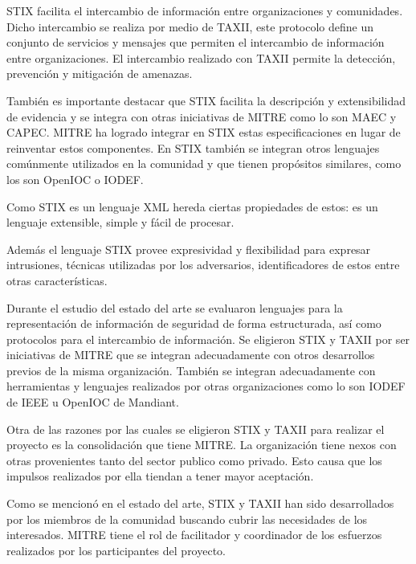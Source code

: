 \documentclass[11pt]{article}
\begin{document}
STIX facilita el intercambio de información entre organizaciones y comunidades. Dicho intercambio se realiza por medio
de TAXII, este protocolo define un conjunto de servicios y mensajes que permiten el intercambio de información entre
organizaciones. El intercambio realizado con TAXII permite la detección, prevención y mitigación de amenazas.


\bigskip

También es importante destacar que STIX facilita la descripción y extensibilidad de evidencia y se integra con otras
iniciativas de MITRE como lo son MAEC y CAPEC. MITRE ha logrado integrar en STIX estas especificaciones en lugar de
reinventar estos componentes. En STIX también se integran otros lenguajes comúnmente utilizados en la comunidad y que
tienen propósitos similares, como los son OpenIOC o IODEF.


\bigskip

Como STIX es un lenguaje XML hereda ciertas propiedades de estos: es un lenguaje extensible, simple y fácil de
procesar.


\bigskip


Además el lenguaje STIX provee expresividad y flexibilidad para expresar intrusiones, técnicas utilizadas por los
adversarios, identificadores de estos entre otras características.


\bigskip

Durante el estudio del estado del arte se evaluaron lenguajes para la representación de información de seguridad de
forma estructurada, así como protocolos para el intercambio de información. Se eligieron STIX y TAXII por ser
iniciativas de MITRE que se integran adecuadamente con otros desarrollos previos de la misma organización. También se
integran adecuadamente con herramientas y lenguajes realizados por otras organizaciones como lo son IODEF de IEEE u
OpenIOC de Mandiant.

Otra de las razones por las cuales se eligieron STIX y TAXII para realizar el proyecto es la consolidación que tiene
MITRE. La organización tiene nexos con otras provenientes tanto del sector publico como privado. Esto causa que los
impulsos realizados por ella tiendan a tener mayor aceptación.

Como se mencionó en el estado del arte, STIX y TAXII han sido desarrollados por los miembros de la comunidad buscando
cubrir las necesidades de los interesados. MITRE tiene el rol de facilitador y coordinador de los esfuerzos realizados
por los participantes del proyecto.
\end{document}
